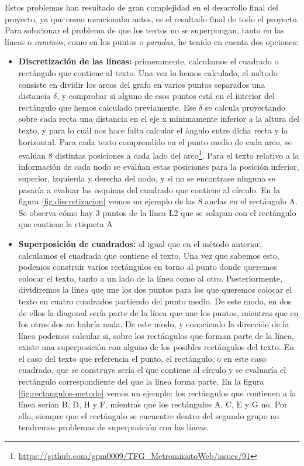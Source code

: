 Estos problemas han resultado de gran complejidad en el desarrollo final del proyecto, ya que como mencionaba antes, es el resultado final de todo el proyecto. Para solucionar el problema de que los textos no se superpongan, tanto en las líneas o \textit{caminos}, como en los puntos o \textit{paradas}, he tenido en cuenta dos opciones:
\begin{itemize}
	\item \textbf{Discretización de las líneas:} primeramente, calculamos el cuadrado o rectángulo que contiene al texto. Una vez lo hemos calculado, el método consiste en dividir los arcos del grafo en varios puntos separados una distancia $\delta$, y comprobar si alguno de esos puntos está en el interior del rectángulo que hemos calculado previamente. Ese $\delta$ se calcula proyectando sobre cada recta una distancia en el eje x mínimamente inferior a la altura del texto, y para lo cuál nos hace falta calcular el ángulo entre dicha recta y la horizontal. Para cada texto comprendido en el punto medio de cada arco, se evalúan 8 distintas posiciones a cada lado del arco\footnote{\url{https://github.com/gpm0009/TFG_MetrominutoWeb/issues/91}}. Para el texto relativo a la información de cada nodo se evalúan estas posiciones para la posición inferior, superior, izquierda y derecha del nodo, y si no se encontrase ninguna se pasaría a evaluar las esquinas del cuadrado que contiene al círculo. En la figura \ref{fig:discretizacion} vemos un ejemplo de las 8 anclas en el rectángulo A. 
	Se observa cómo hay 3 puntos de la línea L2 que se solapan con el rectángulo que contiene la etiqueta A
	
	\item \textbf{Superposición de cuadrados:} al igual que en el método anterior, calculamos el cuadrado que contiene el texto. Una vez que sabemos esto, podemos construir varios rectángulos en torno al punto donde queremos colocar el texto, tanto a un lado de la línea como al otro. Posteriormente, dividiremos la línea que une los dos puntos para los que queremos colocar el texto en cuatro cuadrados partiendo del punto medio. De este modo, en dos de ellos la diagonal sería parte de la línea que une los puntos, mientras que en los otros dos no habría nada. De este modo, y conociendo la dirección de la línea podemos calcular si, sobre los rectángulos que forman parte de la línea, existe una superposición con alguno de los posibles rectángulos del texto. En el caso del texto que referencia el punto, el rectángulo, o en este caso cuadrado, que se construye sería el que contiene al círculo y se evaluaría el rectángulo correspondiente del que la línea forma parte. En la figura \ref{fig:rectangulos-metodo} vemos un ejemplo: los rectángulos que contienen a la línea serían B, D, H y F, mientras que los rectángulos A, C, E y G no. Por ello, siempre que el rectángulo se encuentre dentro del segundo grupo no tendremos problemas de superposición con las líneas.
\end{itemize}
